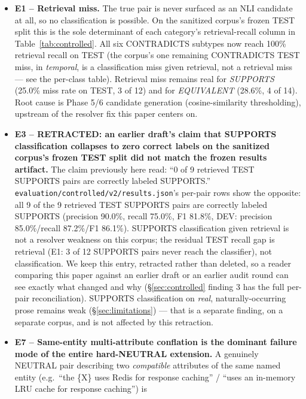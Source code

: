 \begin{itemize}
  \item \textbf{E1 -- Retrieval miss.} The true pair is never surfaced as
    an NLI candidate at all, so no classification is possible. On the
    sanitized corpus's frozen TEST split this is the sole determinant of
    each category's retrieval-recall column in Table~\ref{tab:controlled}.
    All six CONTRADICTS subtypes now reach 100\% retrieval recall on
    TEST (the corpus's one remaining CONTRADICTS TEST miss, in
    \emph{temporal}, is a classification miss given retrieval, not a
    retrieval miss --- see the per-class table). Retrieval miss remains
    real for \emph{SUPPORTS} (25.0\% miss rate on TEST, 3 of 12) and for
    \emph{EQUIVALENT} (28.6\%, 4 of 14). Root cause is Phase 5/6
    candidate generation (cosine-similarity thresholding), upstream of
    the resolver fix this paper centers on.
  \item \textbf{E3 -- RETRACTED: an earlier draft's claim that SUPPORTS
    classification collapses to zero correct labels on the sanitized
    corpus's frozen TEST split did not match the frozen results
    artifact.} The claim previously here read: ``0 of 9 retrieved TEST
    SUPPORTS pairs are correctly labeled SUPPORTS.''
    \texttt{evaluation/controlled/v2/results.json}'s per-pair rows show
    the opposite: all 9 of the 9 retrieved TEST SUPPORTS pairs are
    correctly labeled SUPPORTS (precision 90.0\%, recall 75.0\%, F1
    81.8\%, DEV: precision 85.0\%/recall 87.2\%/F1 86.1\%). SUPPORTS
    classification given retrieval is not a resolver weakness on this
    corpus; the residual TEST recall gap is retrieval (E1: 3 of 12
    SUPPORTS pairs never reach the classifier), not classification. We
    keep this entry, retracted rather than deleted, so a reader comparing
    this paper against an earlier draft or an earlier audit
    round can see exactly what changed and why (\S\ref{sec:controlled}
    finding 3 has the full per-pair reconciliation). SUPPORTS
    classification on \emph{real}, naturally-occurring prose remains
    weak (\S\ref{sec:limitations}) --- that is a separate finding, on a
    separate corpus, and is not affected by this retraction.
  \item \textbf{E7 -- Same-entity multi-attribute conflation is the
    dominant failure mode of the entire hard-NEUTRAL extension.} A
    genuinely NEUTRAL pair describing two \emph{compatible} attributes of
    the same named entity (e.g.\ ``the \{X\} uses Redis for response
    caching'' / ``uses an in-memory LRU cache for response caching'') is

\end{itemize}
